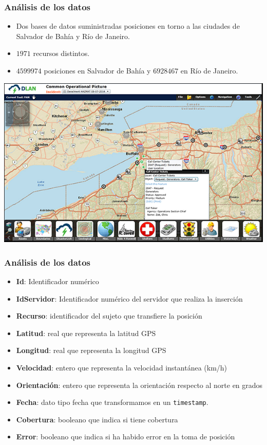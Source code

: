 \documentclass[10pt, spanish]{beamer}
\begin{document}
\begin{frame}[fragile]
\frametitle{An\'alisis de los datos}
\begin{itemize}
	\item Dos bases de datos suministradas posiciones en torno a las ciudades de Salvador de Bah\'ia y R\'io de Janeiro.
	\item $1971$ recursos distintos.
	\item $4599974$ posiciones en Salvador de Bah\'ia y $6928467$ en R\'io de Janeiro.	
\end{itemize}

\begin{center}
\includegraphics[scale=.55]{GIS.png}
\end{center}

\end{frame}

\begin{frame}[fragile]
\frametitle{An\'alisis de los datos}
  \begin{itemize}[<+- | alert@+>]    
\item \textbf{Id}: Identificador num\'erico
\item \textbf{IdServidor}: Identificador num\'erico del servidor que realiza la inserci\'on
\item \textbf{Recurso}: identificador del sujeto que transfiere la posici\'on
\item \textbf{Latitud}: real que representa la latitud GPS
\item \textbf{Longitud}: real que representa la longitud GPS
\item \textbf{Velocidad}: entero que representa la velocidad instant\'anea (km/h)
\item \textbf{Orientaci\'on}: entero que representa la orientaci\'on respecto al norte en grados
\item \textbf{Fecha}: dato tipo fecha que transformamos en un \texttt{timestamp}.
\item \textbf{Cobertura}: booleano que indica si tiene cobertura
\item \textbf{Error}: booleano que indica si ha habido error en la toma de posici\'on
  \end{itemize}
\end{frame}
\end{document}
